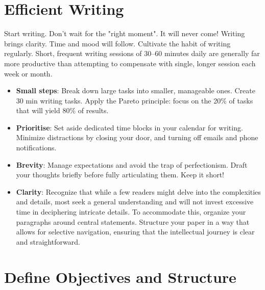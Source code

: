 \documentclass[
    twocolumn,
    fontsize = 10pt,
    parskip = half+,
    headings = small,
    headwidth = text,
    footwidth = text,
]{scrartcl}
\begin{document}
\section{Efficient Writing}
Start writing. Don't wait for the "right moment". 
It will never come! Writing brings clarity. 
Time and mood will follow. 
Cultivate the habit of writing regularly.
Short, frequent writing sessions of \numrange{30}{60} minutes daily are generally far more productive than attempting to compensate with single, longer session each week or month.

\begin{itemize}
    \item  \textbf{Small steps}: Break down large tasks into smaller, manageable ones. Create 30 min writing tasks.  Apply the Pareto principle: focus on the 20\% of tasks that will yield 80\% of results.
    \item \textbf{Prioritise}: Set aside dedicated time blocks in your calendar for writing. Minimize distractions by closing your door, and turning off emails and phone notifications.
    \item \textbf{Brevity}: Manage expectations and avoid the trap of perfectionism. Draft your thoughts briefly before fully articulating them. Keep it short!
    \item \textbf{Clarity}: Recognize that while a few readers might delve into the complexities and details, most seek a general understanding and will not invest excessive time in deciphering intricate details. To accommodate this, organize your paragraphs around central statements. Structure your paper in a way that allows for selective navigation, ensuring that the intellectual journey is clear and straightforward.  
\end{itemize}

\section{Define Objectives and Structure}
\end{document}
